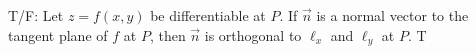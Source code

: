 {T/F: Let $z=f(x,y)$ be differentiable at $P$. If $\vec n$ is a normal vector to the tangent plane of $f$ at $P$, then $\vec n$ is orthogonal to $\ell_x$ and $\ell_y$ at $P$.
}
{T
}